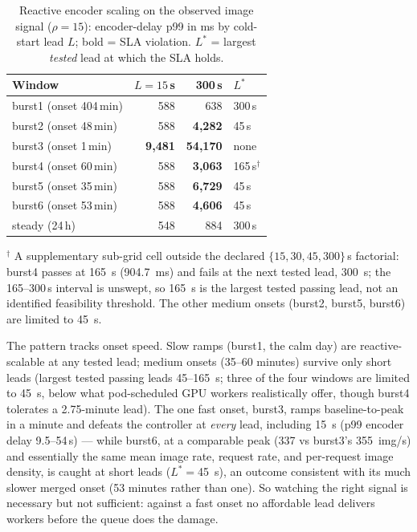 \begin{table}[htbp]
\centering
\caption{Reactive encoder scaling on the observed image signal
($\rho{=}15$): encoder-delay p99 in ms by cold-start lead $L$; bold =
SLA violation. $L^{*}$ = largest \emph{tested} lead at which the SLA
holds.}
\label{tab:base-react-enc}
\small
\begin{tabular}{@{}lrrl@{}}
\toprule
Window & $L{=}15$\,s & 300\,s & $L^{*}$ \\
\midrule
burst1 (onset 404\,min) & 588 & 638 & 300\,s \\
burst2 (onset 48\,min) & 588 & \textbf{4{,}282} & 45\,s \\
burst3 (onset 1\,min) & \textbf{9{,}481} & \textbf{54{,}170} & none \\
burst4 (onset 60\,min) & 588 & \textbf{3{,}063} & 165\,s$^{\dagger}$ \\
burst5 (onset 35\,min) & 588 & \textbf{6{,}729} & 45\,s \\
burst6 (onset 53\,min) & 588 & \textbf{4{,}606} & 45\,s \\
steady (24\,h) & 548 & 884 & 300\,s \\
\bottomrule
\end{tabular}

\vspace{2pt}
{\footnotesize $^{\dagger}$ A supplementary sub-grid cell outside the
declared $\{15,30,45,300\}$\,s factorial: burst4 passes at
\SI{165}{\second} (\SI{904.7}{\milli\second}) and fails at the next
tested lead, \SI{300}{\second}; the 165--300\,s interval is unswept, so
\SI{165}{\second} is the largest tested passing lead, not an identified
feasibility threshold. The other medium onsets (burst2, burst5, burst6)
are limited to \SI{45}{\second}.}
\end{table}

The pattern tracks onset speed. Slow ramps
(burst1, the calm day) are reactive-scalable at any tested lead; medium
onsets (35--60 minutes) survive only short leads (largest tested passing
leads 45--\SI{165}{\second}; three of the four windows are limited to
\SI{45}{\second}, below what pod-scheduled GPU workers realistically
offer, though burst4 tolerates a 2.75-minute lead). The one fast onset,
burst3, ramps baseline-to-peak in a minute and defeats the controller at
\emph{every} lead, including \SI{15}{\second} (p99 encoder delay
9.5--54\,\si{\second}) --- while burst6, at a comparable peak
(\SI{337}{} vs burst3's \SI{355}{img/s}) and essentially the same mean
image rate, request rate, and per-request image density, is caught at
short leads ($L^{*}{=}$\SI{45}{\second}), an outcome consistent with its
much slower merged onset (53 minutes rather than one). So
watching the right signal is necessary but not sufficient: against a fast
onset no affordable lead delivers workers before the queue does the damage.

